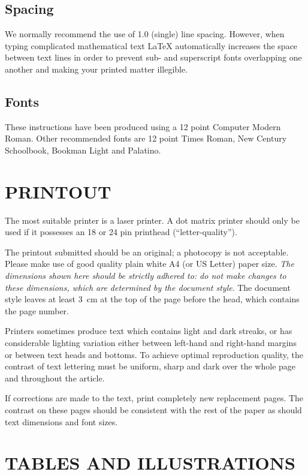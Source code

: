 \subsection{Spacing}

We normally recommend the use of 1.0 (single) line spacing. However,
when typing complicated mathematical text \LaTeX{} automatically
increases the space between text lines in order to prevent sub- and
superscript fonts overlapping one another and making your printed
matter illegible.

\subsection{Fonts}

These instructions have been produced using a 12 point Computer Modern
Roman. Other recommended fonts are 12 point Times Roman, New Century
Schoolbook, Bookman Light and Palatino.

\section{PRINTOUT}

The most suitable printer is a laser printer. A dot matrix printer
should only be used if it possesses an 18 or 24 pin printhead
(``letter-quality'').

The printout submitted should be an original; a photocopy is not
acceptable. Please make use of good quality plain white A4 (or US
Letter) paper size. {\em The dimensions shown here should be strictly
adhered to: do not make changes to these dimensions, which are
determined by the document style}. The document style leaves at least
3~cm at the top of the page before the head, which contains the page
number.

Printers sometimes produce text which contains light and dark streaks,
or has considerable lighting variation either between left-hand and
right-hand margins or between text heads and bottoms. To achieve
optimal reproduction quality, the contrast of text lettering must be
uniform, sharp and dark over the whole page and throughout the article.

If corrections are made to the text, print completely new replacement
pages. The contrast on these pages should be consistent with the rest
of the paper as should text dimensions and font sizes.

\section{TABLES AND ILLUSTRATIONS}

